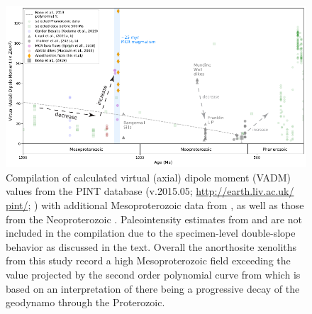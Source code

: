 \documentclass[draft]{agujournal2019}
\begin{document}
\begin{figure}[h!]
\noindent\includegraphics[width=\textwidth]{PINT_compilation.pdf}
\centering
\caption{\footnotesize{Compilation of calculated virtual (axial) dipole moment (VADM) values from the PINT database (v.2015.05; \url{http://earth.liv.ac.uk/ pint/}; ) with additional Mesoproterozoic data from , as well as those from the Neoproterozoic \cite{Lloyd2021a, Lloyd2021b, Thallner2021a, Thallner2021b}. Paleointensity estimates from  and  are not included in the compilation due to the specimen-level double-slope behavior as discussed in the text. Overall the anorthosite xenoliths from this study record a high Mesoproterozoic field exceeding the value projected by the second order polynomial curve from  which is based on an interpretation of there being a progressive decay of the geodynamo through the Proterozoic.}}
\label{fig:PINT_compilation}
\end{figure}

\end{document}
